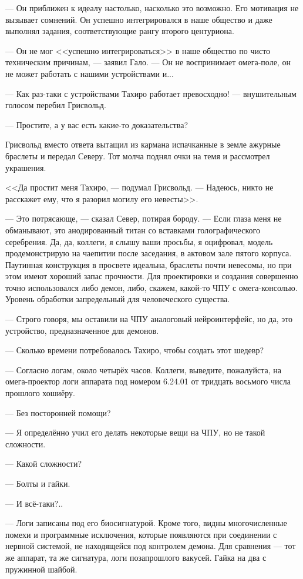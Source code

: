 --- Он приближен к идеалу настолько, насколько это возможно.
Его мотивация не вызывает сомнений.
Он успешно интегрировался в наше общество и даже выполнял задания, соответствующие рангу второго центуриона.

--- Он не мог <<успешно интегрироваться>> в наше общество по чисто техническим причинам, --- заявил Гало.
--- Он не воспринимает омега-поле, он не может работать с нашими устройствами и...

--- Как раз-таки с устройствами Тахиро работает превосходно! --- внушительным голосом перебил Грисвольд.

--- Простите, а у вас есть какие-то доказательства?

Грисвольд вместо ответа вытащил из кармана испачканные в земле ажурные браслеты и передал Северу.
Тот молча поднял очки на темя и рассмотрел украшения.

<<Да простит меня Тахиро, --- подумал Грисвольд.
--- Надеюсь, никто не расскажет ему, что я разорил могилу его невесты>>.

--- Это потрясающе, --- сказал Север, потирая бороду.
--- Если глаза меня не обманывают, это анодированный титан со вставками голографического серебрения.
Да, да, коллеги, я слышу ваши просьбы, я оцифровал, модель продемонстрирую на чаепитии после заседания, в актовом зале пятого корпуса.
Паутинная конструкция в просвете идеальна, браслеты почти невесомы, но при этом имеют хороший запас прочности.
Для проектировки и создания совершенно точно использовался либо демон, либо, скажем, какой-то ЧПУ с омега-консолью.
Уровень обработки запредельный для человеческого существа.

--- Строго говоря, мы оставили на ЧПУ аналоговый нейроинтерфейс, но да, это устройство, предназначенное для демонов.

--- Сколько времени потребовалось Тахиро, чтобы создать этот шедевр?

--- Согласно логам, около четырёх часов.
Коллеги, выведите, пожалуйста, на омега-проектор логи аппарата под номером 6.24.01 от тридцать восьмого числа прошлого хошиёру.

--- Без посторонней помощи?

--- Я определённо учил его делать некоторые вещи на ЧПУ, но не такой сложности.

--- Какой сложности?

--- Болты и гайки.

--- И всё-таки?..

--- Логи записаны под его биосигнатурой.
Кроме того, видны многочисленные помехи и программные исключения, которые появляются при соединении с нервной системой, не находящейся под контролем демона.
Для сравнения --- тот же аппарат, та же сигнатура, логи позапрошлого вакусей.
Гайка на два с пружинной шайбой.

